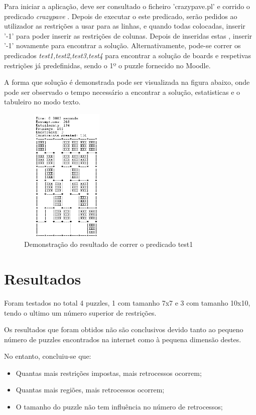 \documentclass[runningheads,a4paper,12pt]{llncs}
\begin{document}
Para iniciar a aplicação, deve ser consultado o ficheiro 'crazypave.pl' e corrido o predicado \textit{crazypave} .
Depois de executar o este predicado, serão pedidos ao utilizador as restrições a usar para as linhas, e quando todas colocadas, inserir '-1' para poder inserir as restrições de colunas.
Depois de inseridas estas , inserir '-1' novamente para encontrar a solução.
Alternativamente, pode-se correr os predicados \textit{test1,test2,test3,test4} para encontrar a solução de boards e respetivas restrições já predefinidas, sendo o 1º o puzzle fornecido no Moodle.

A forma que solução é demonstrada pode ser visualizada na figura abaixo, onde pode ser observado o tempo necessário a encontrar a solução, estatisticas e o tabuleiro no modo texto.



\begin{figure}
\centering
\includegraphics[height=6.5cm,width=4.5cm]{exemplo4.png}
\caption{Demonstração do resultado de correr o predicado test1} 
\label{fig:crazypavementexandsol}
\end{figure}

\section{Resultados}

Foram testados no total 4 puzzles, 1 com tamanho 7x7 e 3 com tamanho 10x10, tendo o ultimo um número superior de restrições.

Os resultados que foram obtidos não são conclusivos devido tanto ao pequeno número de puzzles encontrados na internet como à pequena dimensão destes.

No entanto, concluiu-se que:

\begin{itemize}
  \item Quantas mais restrições impostas, mais retrocessos ocorrem;
  \item Quantas mais regiões, mais retrocessos ocorrem;
  \item O tamanho do puzzle não tem influência no número de retrocessos;
\end{itemize}
\end{document}
